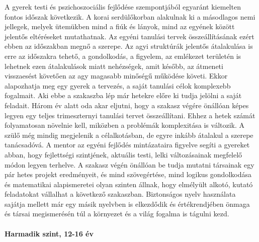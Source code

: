       A gyerek testi és pszichoszociális fejlődése szempontjából egyaránt kiemelten fontos időszak következik. A korai serdülőkorban alakulnak ki a másodlagos nemi jellegek, melyek ütemükben mind a fiúk és lányok, mind az egyének között jelentős eltéréseket mutathatnak. Az egyéni tanulási tervek összeállításának ezért ebben az időszakban megnő a szerepe. Az agyi struktúrák jelentős átalakulása is erre az időszakra tehető, a gondolkodás, a figyelem, az emlékezet területén is lehetnek ezen átalakulások miatt nehézségek, amit később, az átmeneti visszaesést követően az agy magasabb minőségű működése követi. Ekkor alapozhatja meg egy gyerek a tervezés, a saját tanulási célok komplexebb fogalmait. Aki ebbe a szakaszba lép már hetekre előre ki tudja jelölni a saját feladait. Három év alatt oda akar eljutni, hogy a szakasz végére önállóan képes legyen egy teljes trimeszternyi tanulási tervet összeállítani. Ehhez a hetek számát folyamatosan növelnie kell, miközben a problémák komplexitása is változik. A szülő még mindig megjelenik a célalkotásban, de egyre inkább átalakul a szerepe tanácsadóvá. A mentor az egyéni fejlődés mintázataira figyelve segíti a gyereket abban, hogy fejlettségi szintjének, aktuális testi, lelki változásainak megfelelő módon legyen terhelve. 
      A szakasz végén önállóan be tudja mutatni társainak egy pár hetes projekt eredményeit, és mind szövegértése, mind logikus gondolkodása és matematikai alapismeretei olyan szinten állnak, hogy elmélyült alkotó, kutató feladatokat vállalhat a következő szakaszban. Biztonságos nyelv használata sajátja mellett már egy másik nyelvben is elkezdődik és értékrendjében önmaga és társai megismerésén túl a környezet és a világ fogalma is tágulni kezd.
      
      \paragraph{Harmadik szint, 12-16 év}

